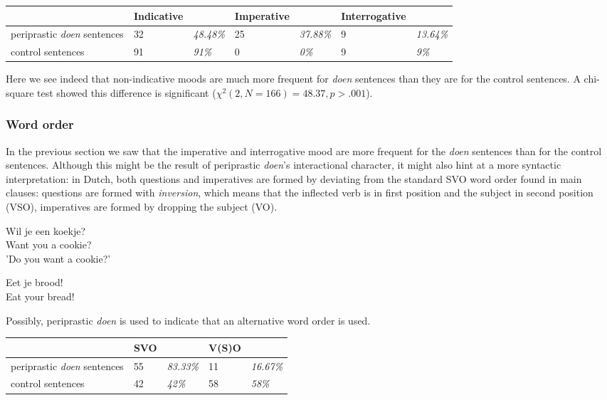 \documentclass[12pt]{article}
\begin{document}
\begin{table}[h]
\begin{tabular}{|l|ll|ll|ll|}
\hline
&Indicative&&Imperative&&Interrogative&\\
\hline
periprastic \emph{doen} sentences	&32 	& \emph{48.48\%}	&25		&\emph{37.88\%} & 9 &\emph{13.64\%}\\
control sentences					&91		& \emph{91\%}		&0	 	&\emph{0\%} 	& 9 &\emph{9\%}\\
\hline
\end{tabular}
\end{table}

Here we see indeed that non-indicative moods are much more frequent for \emph{doen} sentences than they are for the control sentences. A chi-square test showed this difference is significant ($\chi^2(2, N=166) = 48.37, p > .001$).

\subsubsection{Word order}

In the previous section we saw that the imperative and interrogative mood are more frequent for the \emph{doen} sentences than for the control sentences. Although this might be the result of periprastic \emph{doen}'s interactional character, it might also hint at a more syntactic interpretation: in Dutch, both questions and imperatives are formed by deviating from the standard SVO word order found in main clauses: questions are formed with \emph{inversion}, which means that the inflected verb is in first position and the subject in second position (VSO), imperatives are formed by dropping the subject (VO).

\begin{exe}
\ex \gll Wil je een koekje?\\
Want you a cookie?\\
'Do you want a cookie?'

\ex \gll Eet je brood!\\
Eat your bread!\\
\end{exe}

Possibly, periprastic \emph{doen} is used to indicate that an alternative word order is used.

\begin{table}[h]
\begin{tabular}{|l|ll|ll|}
\hline
&SVO&&V(S)O&\\
\hline
periprastic \emph{doen} sentences	&55 	& \emph{83.33\%}	&11		 &\emph{16.67\%}\\
control sentences				&42		& \emph{42\%}		&58		 &\emph{58\%}\\
\hline
\end{tabular}
\end{table}
\end{document}
